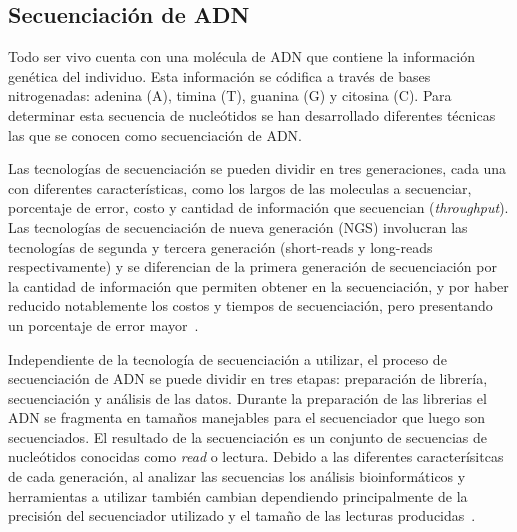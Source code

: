 \subsection{Secuenciación de ADN}
Todo ser vivo cuenta con una molécula de ADN que contiene la información genética del individuo. 
Esta información se códifica a través de bases nitrogenadas: adenina (A), timina (T), guanina (G) y citosina (C).%
Para determinar esta secuencia de nucleótidos se han desarrollado diferentes técnicas las que se conocen como secuenciación de ADN. 

Las tecnologías de secuenciación se pueden dividir en tres generaciones, cada una con diferentes características, como los largos de las moleculas a secuenciar, porcentaje de error, costo y cantidad de información que secuencian (\textit{throughput}).
Las tecnologías de secuenciación de nueva generación (NGS) involucran las tecnologías de segunda y tercera generación (short-reads y long-reads respectivamente) y se diferencian de la primera generación de secuenciación por la cantidad de información que permiten obtener en la secuenciación, y por haber reducido notablemente los costos y tiempos de secuenciación, pero presentando un porcentaje de error mayor~\cite{kumar2024next}. 

Independiente de la tecnología de secuenciación a utilizar, el proceso de secuenciación de ADN se puede dividir en tres etapas: preparación de librería, secuenciación y análisis de las datos. Durante la preparación de las librerias el ADN se fragmenta en tamaños manejables para el secuenciador que luego son secuenciados. El resultado de la secuenciación es un conjunto de secuencias de nucleótidos conocidas como \textit{read} o lectura.
Debido a las diferentes caracterísitcas de cada generación, al analizar las secuencias los análisis bioinformáticos y herramientas a utilizar también cambian dependiendo principalmente de la precisión del secuenciador utilizado y el tamaño de las lecturas producidas~\cite{bierman2014understanding}.


